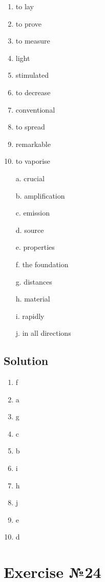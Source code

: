 \begin{enumerate}
      \item to lay
      \item to prove
      \item to measure
      \item light
      \item stimulated
      \item to decrease
      \item conventional
      \item to spread
      \item remarkable
      \item to vaporise \\
\end{enumerate}

\begin{enumerate}
      \item[a.] crucial
      \item[b.] amplification
      \item[c.] emission
      \item[d.] source
      \item[e.] properties
      \item[f.] the foundation
      \item[g.] distances
      \item[h.] material
      \item[i.] rapidly
      \item[j.] in all directions
\end{enumerate}

\subsection*{Solution}
\begin{enumerate}
      \item f
      \item a
      \item g
      \item c
      \item b
      \item i
      \item h
      \item j
      \item e
      \item d
\end{enumerate}

\section*{Exercise №24}

